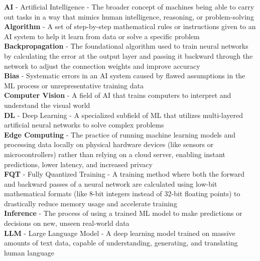 \begingroup
\setlength{\parindent}{0pt}
\begin{singlespace}
\textbf{AI} - Artificial Intelligence - The broader concept of machines
being able to carry out tasks in a way that mimics human intelligence,
reasoning, or problem-solving  \\

\textbf{Algorithm} - A set of step-by-step mathematical rules or
instructions given to an AI system to help it learn from data
or solve a specific problem  \\

\textbf{Backpropagation} - The foundational algorithm used to train neural
networks by calculating the error at the output layer and passing it
backward through the network to adjust the connection weights and improve
accuracy  \\

\textbf{Bias} - Systematic errors in an AI system caused by flawed
assumptions in the ML process or unrepresentative training data  \\

\textbf{Computer Vision} - A field of AI that trains computers to interpret
and understand the visual world  \\

\textbf{DL} - Deep Learning - A specialized subfield of ML that utilizes
multi-layered artificial neural networks to solve complex problems  \\

\textbf{Edge Computing} - The practice of running machine learning models
and processing data locally on physical hardware devices (like sensors or
microcontrollers) rather than relying on a cloud server, enabling instant
predictions, lower latency, and increased privacy  \\

\textbf{FQT} - Fully Quantized Training - A training method where both the
forward and backward passes of a neural network are calculated using low-bit
mathematical formats (like 8-bit integers instead of 32-bit floating points)
to drastically reduce memory usage and accelerate training  \\

\textbf{Inference} - The process of using a trained ML model to make
predictions or decisions on new, unseen real-world data  \\

\textbf{LLM} - Large Language Model - A deep learning model trained on
massive amounts of text data, capable of understanding, generating, and
translating human language  \\


\end{singlespace}
